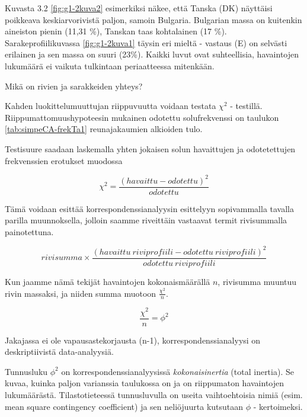 \documentclass[
  finnish,
]{book}
\begin{document}
Kuvasta 3.2 \ref{fig:g1-2kuva2} esimerkiksi näkee, että Tanska (DK) näyttäisi
poikkeava keskiarvorivistä paljon, samoin Bulgaria.
Bulgarian massa on kuitenkin aineiston pienin (11,31 \%), Tanskan taas
kohtalainen (17 \%).
Sarakeprofiilikuvassa \ref{fig:g1-2kuva1} täysin eri mieltä - vastaus (E) on
selvästi erilainen ja sen massa on suuri (23\%). Kaikki luvut ovat suhteellisia,
havaintojen lukumäärä ei vaikuta tulkintaan periaatteessa mitenkään.

Mikä on rivien ja sarakkeiden yhteys?

Kahden luokittelumuuttujan riippuvuutta voidaan testata \(\chi^{2}\) - testillä.
Riippumattomuushypoteesin mukainen odotettu solufrekvenssi on taulukon
\ref{tab:simpeCA-frekTa1} reunajakaumien alkioiden tulo.

Testisuure saadaan laskemalla yhten jokaisen solun havaittujen ja odotetettujen
frekvenssien erotukset muodossa

\begin{equation}
  \chi^{2} = \frac{(havaittu - odotettu)^2} {odotettu}
    \label{eq:khii21}
\end{equation}

Tämä voidaan esittää korrespondenssianalyysin esittelyyn sopivammalla tavalla
parilla muunnoksella, jolloin saamme riveittäin vastaavat termit rivisummalla
painotettuna.

\begin{equation}
  rivisumma \times \frac{(havaittu \: riviprofiili - odotettu \: riviprofiili)^2} {odotettu \: riviprofiili}
    \label{eq:khii22}
\end{equation}

Kun jaamme nämä tekijät havaintojen kokonaismäärällä \(n\), rivisumma muuntuu
rivin massaksi, ja niiden summa muotoon \(\frac{\chi^{2}}{n}\).

\begin{equation}
 \frac{\chi^{2}}{n} = \phi^{2}
  \label{eq:inert1}
 \end{equation}

Jakajassa ei ole vapausastekorjausta (n-1), korrespondenssianalyysi on
deskriptiivistä data-analyysiä.

Tunnusluku \(\phi^{2}\) on korrespondenssianalyysissä \emph{kokonaisinertia} (total
inertia). Se kuvaa, kuinka paljon varianssia taulukossa on ja on riippumaton
havaintojen lukumäärästä. Tilastotieteessä tunnusluvulla on useita vaihtoehtoisia
nimiä (esim. mean square contingency coefficient) ja sen neliöjuurta kutsutaan
\(\phi\) - kertoimeksi.
\end{document}
